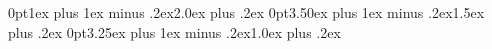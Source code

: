 \titlespacing*{\chapter}		 {0pt}{1ex plus 1ex minus .2ex}{2.0ex plus .2ex}
\titlespacing*{\section}      {0pt}{3.50ex plus 1ex minus .2ex}{1.5ex plus .2ex}
\titlespacing*{\subsection}   {0pt}{3.25ex plus 1ex minus .2ex}{1.0ex plus .2ex}

\newtheorem{mydef}{Определение}[chapter]
\newtheorem{prop}{Свойство}[chapter]
\newtheorem{theorem}{Теорема}[chapter]